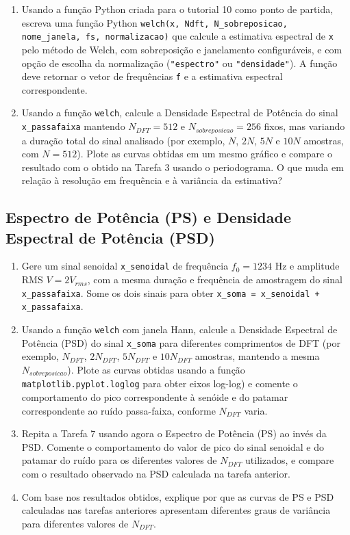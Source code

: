 \documentclass[a4paper,twoside,12pt]{article}
\begin{document}
\begin{enumerate}
		\item Usando a função Python criada para o tutorial 10 como ponto de partida, escreva uma função Python {\tt welch(x, Ndft, N\_sobreposicao, nome\_janela, fs, normalizacao)} que calcule a estimativa espectral de {\tt x} pelo método de Welch, com sobreposição e janelamento configuráveis, e com opção de escolha da normalização (\texttt{"espectro"} ou \texttt{"densidade"}). A função deve retornar o vetor de frequências {\tt f} e a estimativa espectral correspondente.
		
		\item Usando a função {\tt welch}, calcule a Densidade Espectral de Potência do sinal {\tt x\_passafaixa} mantendo $N_{DFT} = 512$ e $N_{sobreposicao} = 256$ fixos, mas variando a duração total do sinal analisado (por exemplo, $N$, $2 N$, $5 N$ e $10 N$ amostras, com $N = 512$). Plote as curvas obtidas em um mesmo gráfico e compare o resultado com o obtido na Tarefa 3 usando o periodograma. O que muda em relação à resolução em frequência e à variância da estimativa?
	\end{enumerate}
	
	
	\subsection{Espectro de Potência (PS) e Densidade Espectral de Potência (PSD)}
	
	\begin{enumerate}
		\item Gere um sinal senoidal {\tt x\_senoidal} de frequência $f_0 = 1234$ Hz e amplitude RMS $V = 2 V_{rms}$, com a mesma duração e frequência de amostragem do sinal {\tt x\_passafaixa}. Some os dois sinais para obter {\tt x\_soma = x\_senoidal + x\_passafaixa}.
		
		\item Usando a função {\tt welch} com janela Hann, calcule a Densidade Espectral de Potência (PSD) do sinal {\tt x\_soma} para diferentes comprimentos de DFT (por exemplo, $N_{DFT}$, $2 N_{DFT}$, $5 N_{DFT}$ e $10 N_{DFT}$ amostras, mantendo a mesma $N_{sobreposicao}$). Plote as curvas obtidas usando a função \texttt{matplotlib.pyplot.loglog} para obter eixos log-log) e comente o comportamento do pico correspondente à senóide e do patamar correspondente ao ruído passa-faixa, conforme $N_{DFT}$ varia.
		
		\item Repita a Tarefa 7 usando agora o Espectro de Potência (PS) ao invés da PSD. Comente o comportamento do valor de pico do sinal senoidal e do patamar do ruído para os diferentes valores de $N_{DFT}$ utilizados, e compare com o resultado observado na PSD calculada na tarefa anterior. 
		
		\item Com base nos resultados obtidos, explique por que as curvas de PS e PSD calculadas nas tarefas anteriores apresentam diferentes graus de variância para diferentes valores de $N_{DFT}$.
	\end{enumerate}
	
\end{document}
